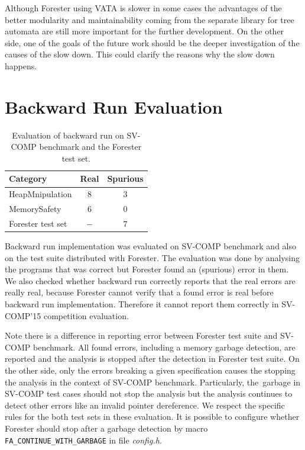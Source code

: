 Although Forester using VATA is slower in some cases
the advantages of the better modularity
and maintainability coming from the separate library
for tree automata are still more important
for the further development.
On the other side, one of the goals of the future work should be
the deeper investigation of the causes of the slow down.
This could clarify the reasons why the slow down happens.


\section{Backward Run Evaluation}
\label{sec:bweval}

\begin{table}[bt]
	\vskip6pt
	\caption{Evaluation of backward run on SV-COMP benchmark
		and the Forester test set.
	}
	\centering
	\begin{tabular}{lcc}
		\toprule
		Category & Real & Spurious \\
		\midrule
		HeapMnipulation & $8$ & $3$ \\
		MemorySafety & $6$ & $0$ \\
		Forester test set & $-$ & $7$ \\
		\bottomrule
	\end{tabular}
	\label{tab:bwres}
\end{table}

Backward run implementation was evaluated on SV-COMP benchmark
and also on the test suite distributed with Forester.
The evaluation was done by analysing the programs that was correct
but Forester found an (spurious) error in them.
We also checked whether backward run correctly
reports that the real errors are really real,
because Forester cannot verify
that a found error is real before backward run implementation.
Therefore it cannot report them correctly in SV-COMP'15 competition
evaluation.

Note there is a difference in reporting error between
Forester test suite and SV-COMP benchmark.
All found errors, including a memory garbage detection, are reported
and the analysis is stopped after the detection in Forester test suite.
On the other side, only the errors breaking a given specification
causes the stopping the analysis in the context of SV-COMP benchmark.
Particularly, the~garbage in SV-COMP test cases should not
stop the analysis but the analysis continues to
detect other errors like an invalid pointer dereference.
We respect the specific rules for the both test sets in these evaluation.
It is possible to configure whether
Forester should stop after a garbage detection by
macro {\tt FA\_CONTINUE\_WITH\_GARBAGE} in file \emph{config.h}.

